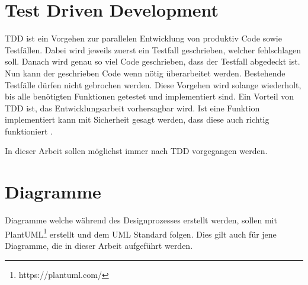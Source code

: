 \section{Test Driven Development} \label{tdd}
\ac{TDD} ist ein Vorgehen zur parallelen Entwicklung von produktiv Code sowie Testfällen.
Dabei wird jeweils zuerst ein Testfall geschrieben, welcher fehlschlagen soll.
Danach wird genau so viel Code geschrieben, dass der Testfall abgedeckt ist.
Nun kann der geschrieben Code wenn nötig überarbeitet werden.
Bestehende Testfälle dürfen nicht gebrochen werden.
Diese Vorgehen wird solange wiederholt, bis alle benötigten Funktionen getestet und implementiert sind.
Ein Vorteil von \ac{TDD} ist, das Entwicklungsarbeit vorhersagbar wird.
Ist eine Funktion implementiert kann mit Sicherheit gesagt werden, dass diese auch richtig funktioniert \parencite{beck2003test}.

In dieser Arbeit sollen möglichst immer nach \ac{TDD} vorgegangen werden.


\section{Diagramme}
Diagramme welche während des Designprozesses erstellt werden, sollen mit PlantUML\footnote{https://plantuml.com/} erstellt und dem UML Standard folgen.
Dies gilt auch für jene Diagramme, die in dieser Arbeit aufgeführt werden.